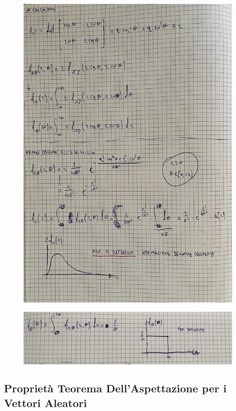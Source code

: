 \documentclass{article}
\begin{document}
\begin{figure}[ht]
\centering
\includegraphics[scale=0.16]{images/82a.jpeg}
\end{figure} 
\begin{figure}[ht]
\centering
\includegraphics[scale=0.14]{images/82b.jpeg}
\end{figure} 

\subsection{Proprietà Teorema Dell’Aspettazione per i Vettori Aleatori}
\end{document}
